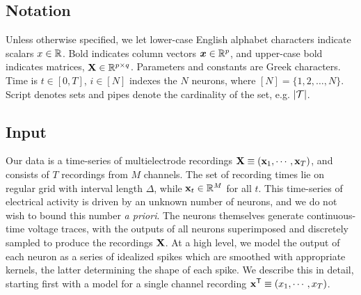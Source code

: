 \newcommand{\bY}{\mathbf{Y}}
\newcommand{\NN}{\mathbb{N}}         

\subsection{Notation}

Unless otherwise specified, we let lower-case English alphabet characters indicate scalars $x \in \mathbb{R}$. Bold indicates column vectors $\boldsymbol{x} \in \mathbb{R}^p$,
and upper-case bold indicates matrices, $\mathbf{X} \in \mathbb{R}^{p \times q}$.  Parameters and constants are Greek characters.  Time is $t \in [0,T]$, 
$i \in [N]$ indexes the $N$ neurons, where $[N]=\{1,2,\ldots,N\}$. Script denotes sets and pipes denote the cardinality of the set, e.g. $|\mathcal{T}|$.  
\vspace{-.1in}
\subsection{Input}
\vspace{-.1in}
Our data is a time-series of multielectrode recordings $\mathbf{X} \equiv (\mathbf{x}_1, \cdots, \mathbf{x}_T)$, and consists of $T$ recordings from $M$ channels. 
The set of recording times lie on regular grid with interval length $\Delta$, while $\mathbf{x}_t \in \mathbb{R}^M$ for all $t$. 
This time-series of electrical activity is driven by an unknown number of neurons, and 
we do not wish to bound this number \emph{a priori}. %
The neurons themselves generate continuous-time voltage traces, with the outputs of all neurons superimposed and discretely sampled to produce the 
recordings $\mathbf{X}$.  At a high level, we model the output of each neuron as a
series of idealized spikes which are smoothed with appropriate kernels, the latter determining the shape of each spike. 
We describe this in detail, starting first with a model for a single channel recording $\mathbf{x}^{\mathsf{T}} \equiv (x_1, \cdots, x_T)$.

